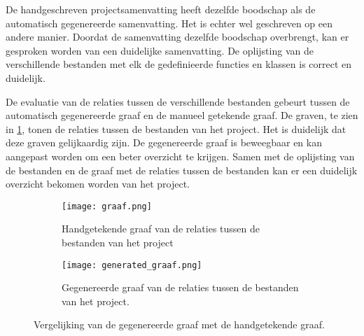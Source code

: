De handgeschreven projectsamenvatting heeft dezelfde boodschap als de automatisch gegenereerde samenvatting. Het is echter wel geschreven op een andere manier.
Doordat de samenvatting dezelfde boodschap overbrengt, kan er gesproken worden van een duidelijke samenvatting.
De oplijsting van de verschillende bestanden met elk de gedefinieerde functies en klassen is correct en duidelijk.

De evaluatie van de relaties tussen de verschillende bestanden gebeurt tussen de automatisch gegenereerde graaf en de manueel getekende graaf.
De graven, te zien in \ref{fig:evaluatie-graaf}, tonen de relaties tussen de bestanden van het project. 
Het is duidelijk dat deze graven gelijkaardig zijn. De gegenereerde graaf is beweegbaar en kan aangepast worden om een beter overzicht te krijgen.
Samen met de oplijsting van de bestanden en de graaf met de relaties tussen de bestanden kan er een duidelijk overzicht bekomen worden van het project.

\begin{figure}
    \centering
    \begin{subfigure}[b]{1\textwidth}
        \centering
        \texttt{[image: graaf.png]}
        \caption{Handgetekende graaf van de relaties tussen de bestanden van het project \autocite{Simmons2019}}
    \end{subfigure}
    \hfill
    \begin{subfigure}[b]{0.5\textwidth}
        \centering
        \texttt{[image: generated\_graaf.png]}
        \caption{Gegenereerde graaf van de relaties tussen de bestanden van het project. \autocite{Simmons2019}}
    \end{subfigure}
    \caption{Vergelijking van de gegenereerde graaf met de handgetekende graaf.}
    \label{fig:evaluatie-graaf}
\end{figure}